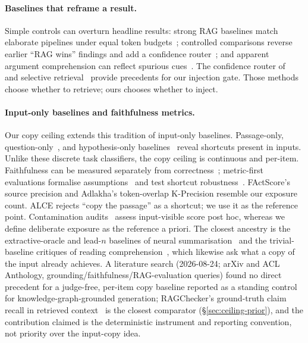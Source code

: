\documentclass[10pt,twocolumn]{article}
\begin{document}
\paragraph{Baselines that reframe a result.}
Simple controls can overturn headline results: strong RAG baselines match elaborate pipelines under equal token budgets~\cite{laitenberger2025stronger}; controlled comparisons reverse earlier ``RAG wins'' findings and add a confidence router~\cite{li2024ragorlongcontext}; and apparent argument comprehension can reflect spurious cues~\cite{niven2019probing}. The confidence router of~\textcite{li2024ragorlongcontext} and selective retrieval~\cite{asai2024selfrag,jeong2024adaptiverag,mallen2023trust} provide precedents for our injection gate. Those methods choose whether to retrieve; ours chooses whether to inject.

\paragraph{Input-only baselines and faithfulness metrics.}
Our copy ceiling extends this tradition of input-only baselines. Passage-only, question-only~\cite{kaushik2018reading}, and hypothesis-only baselines~\cite{gururangan2018artifacts,poliak2018hypothesis} reveal shortcuts present in inputs. Unlike these discrete task classifiers, the copy ceiling is continuous and per-item. Faithfulness can be measured separately from correctness~\cite{es2023ragas,adlakha2024evaluating,zhou2023contextfaithful}; metric-first evaluations formalise assumptions~\cite{min2023factscore} and test shortcut robustness~\cite{gao2023alce}. FActScore's source precision and Adlakha's token-overlap K-Precision resemble our exposure count. ALCE rejects ``copy the passage'' as a shortcut; we use it as the reference point. Contamination audits~\cite{sainz2023contamination,golchin2024timetravel} assess input-visible score post hoc, whereas we define deliberate exposure as the reference a priori. The closest ancestry is the extractive-oracle and lead-$n$ baselines of neural summarisation~\cite{see2017pointergenerator,narayan2018xsum} and the trivial-baseline critiques of reading comprehension~\cite{kaushik2018reading}, which likewise ask what a copy of the input already achieves. A literature search (2026-08-24; arXiv and ACL Anthology, grounding/faithfulness/RAG-evaluation queries) found no direct precedent for a judge-free, per-item copy baseline reported as a standing control for knowledge-graph-grounded generation; RAGChecker's ground-truth claim recall in retrieved context~\cite{ragchecker2024} is the closest comparator (\S\ref{sec:ceiling-prior}), and the contribution claimed is the deterministic instrument and reporting convention, not priority over the input-copy idea.
\end{document}
